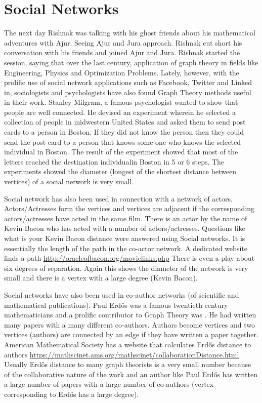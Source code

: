 \chapter{Social Networks}

 The next day Rishnak was talking with his ghost friends about his mathematical adventures with Ajur. Seeing Ajur and Jura approach. Rishnak cut short his conversation with his friends and joined Ajur and Jura. Rishnak started the session, saying that over the last century, application of graph theory in fields like Engineering, Physics and Optimization Problems. Lately, however,  with the prolific use of social network applications such as Facebook, Twitter and Linked in, sociologists and psychologists have also found Graph Theory methods useful in their work.  
Stanley Milgram, a famous psychologist wanted to show that people are well connected. He devised an experiment wherein he selected a collection of people in midwestern United States and asked them to send post cards to a person in Boston. If they did not know the person then they could send the post card to a person that knows some one who knows the selected individual in Boston. The result of the experiment showed that most of the letters reached the destination individualin Boston in 5 or 6 steps. The experiments showed the diameter (longest of the shortest distance between vertices) of a social network is very small.

Social network has also been used in connection with a network of actors. Actors/Actresses form the vertices and vertices are adjacent if the corresponding actors/actresses have acted in the same film. There is an actor by the name of Kevin Bacon who has acted with a number of actors/actresses. Questions like what is your Kevin Bacon distance were answered using Social networks. It is essentially the length of the path  in the co-actor network. A dedicated website finds a path \url{http://oracleofbacon.org/movielinks.php} There is even a play about six degrees of separation. Again this shows the diameter of the network is very small and there is a vertex with a large degree (Kevin Bacon).

Social networks have also been used in co-author networks (of scientific and mathematical publications). Paul Erd\H{o}s was a famous twentieth century mathematicians and a prolific contributor to Graph Theory was . He had written many papers with a many different  co-authors. Authors become vertices and two vertices (authors) are connected by an edge if they have written a paper together. American Mathematical Society has a website that calculates Erd\H{o}s distance to authors
\url{https://mathscinet.ams.org/mathscinet/collaborationDistance.html}. Usually Erd\H{o}s distance to many graph theorists is a very small number because of the collaborative nature of the work and an author like Paul Erd\H{o}s has written a large number of papers with a large number of co-authors (vertex corresponding to Erd\H{o}s has a large degree).

